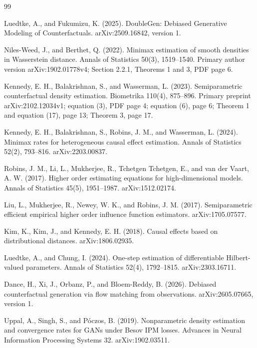\documentclass{article}
\begin{document}
\begin{thebibliography}{99}

   Luedtke, A., and Fukumizu, K. (2025). DoubleGen: Debiased Generative Modeling of Counterfactuals. arXiv:2509.16842, version 1.

   Niles-Weed, J., and Berthet, Q. (2022). Minimax estimation of smooth densities in Wasserstein distance. Annals of Statistics 50(3), 1519--1540. Primary author version arXiv:1902.01778v4; Section 2.2.1, Theorems 1 and 3, PDF page 6.

   Kennedy, E. H., Balakrishnan, S., and Wasserman, L. (2023). Semiparametric counterfactual density estimation. Biometrika 110(4), 875--896. Primary preprint arXiv:2102.12034v1; equation (3), PDF page 4; equation (6), page 6; Theorem 1 and equation (17), page 13; Theorem 3, page 17.

   Kennedy, E. H., Balakrishnan, S., Robins, J. M., and Wasserman, L. (2024). Minimax rates for heterogeneous causal effect estimation. Annals of Statistics 52(2), 793--816. arXiv:2203.00837.

   Robins, J. M., Li, L., Mukherjee, R., Tchetgen Tchetgen, E., and van der Vaart, A. W. (2017). Higher order estimating equations for high-dimensional models. Annals of Statistics 45(5), 1951--1987. arXiv:1512.02174.

   Liu, L., Mukherjee, R., Newey, W. K., and Robins, J. M. (2017). Semiparametric efficient empirical higher order influence function estimators. arXiv:1705.07577.

   Kim, K., Kim, J., and Kennedy, E. H. (2018). Causal effects based on distributional distances. arXiv:1806.02935.

   Luedtke, A., and Chung, I. (2024). One-step estimation of differentiable Hilbert-valued parameters. Annals of Statistics 52(4), 1792--1815. arXiv:2303.16711.

   Dance, H., Xi, J., Orbanz, P., and Bloem-Reddy, B. (2026). Debiased counterfactual generation via flow matching from observations. arXiv:2605.07665, version 1.

   Uppal, A., Singh, S., and Póczos, B. (2019). Nonparametric density estimation and convergence rates for GANs under Besov IPM losses. Advances in Neural Information Processing Systems 32. arXiv:1902.03511.


\end{thebibliography}
\end{document}
